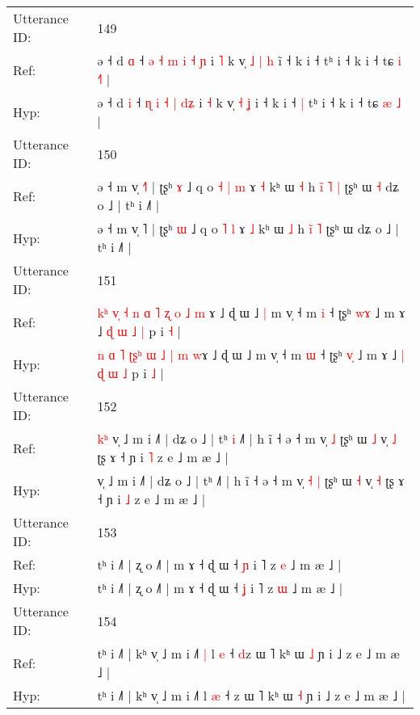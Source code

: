 \documentclass[10pt]{article}
\DeclareRobustCommand{\hl}[1]{{\textcolor{red}{#1}}}
\begin{document}
\begin{longtable}{ll}
 \\
\midrule
Utterance ID: & 149 \\
Ref: & ə ˧ d \hl{ɑ} ˧ \hl{ə} \hl{˧} \hl{m} \hl{i} \hl{˧}\hl{ }\hl{ɲ} i \hl{˥} k v̩\hl{ }\hl{˩} \hl{|} \hl{h} i\hl{̃} ˧ k i ˧\hl{}\hl{} tʰ i ˧ k i ˧ tɕ \hl{i} \hl{˧}\hl{˥} |
 \\
Hyp: & ə ˧ d \hl{i} ˧ \hl{ɳ} \hl{i} \hl{˧} \hl{|} \hl{}\hl{d}\hl{ʑ} i \hl{˧} k v̩\hl{}\hl{} \hl{˧} \hl{ʝ} i\hl{} ˧ k i ˧\hl{ }\hl{|} tʰ i ˧ k i ˧ tɕ \hl{æ} \hl{}\hl{˩} |
 \\
\midrule
Utterance ID: & 150 \\
Ref: & ə ˧ m v̩ \hl{˧}˥ | ʈʂʰ \hl{ɤ} ˩ q o\hl{ }\hl{˧} \hl{|} \hl{m} ɤ \hl{˧} kʰ ɯ \hl{˧} h \hl{ĩ}\hl{ }\hl{˥} \hl{|} ʈʂʰ ɯ\hl{ }\hl{˧} dʑ o ˩ | tʰ i ˩˥ |
 \\
Hyp: & ə ˧ m v̩ \hl{}˥ | ʈʂʰ \hl{ɯ} ˩ q o\hl{}\hl{} \hl{˥} \hl{l} ɤ \hl{˩} kʰ ɯ \hl{˩} h \hl{}\hl{i}\hl{̃} \hl{˥} ʈʂʰ ɯ\hl{}\hl{} dʑ o ˩ | tʰ i ˩˥ |
 \\
\midrule
Utterance ID: & 151 \\
Ref: & \hl{k}\hl{ʰ} \hl{v}\hl{̩} \hl{˧} \hl{n}\hl{ }\hl{ɑ} \hl{˥} \hl{ʐ} \hl{o} \hl{˩} \hl{m}\hl{ }ɤ ˩ ɖ ɯ ˩\hl{ }\hl{|} m v̩ ˧ m \hl{i} ˧ ʈʂʰ \hl{w}\hl{ɤ} ˩ m ɤ ˩ \hl{ɖ} \hl{ɯ} \hl{˩} \hl{|} p i \hl{˧} |
 \\
Hyp: & \hl{}\hl{n} \hl{}\hl{ɑ} \hl{˥} \hl{ʈ}\hl{ʂ}\hl{ʰ} \hl{ɯ} \hl{˩} \hl{|} \hl{m} \hl{}\hl{w}ɤ ˩ ɖ ɯ ˩\hl{}\hl{} m v̩ ˧ m \hl{ɯ} ˧ ʈʂʰ \hl{v}\hl{̩} ˩ m ɤ ˩ \hl{|} \hl{ɖ} \hl{ɯ} \hl{˩} p i \hl{˩} |
 \\
\midrule
Utterance ID: & 152 \\
Ref: & \hl{k}\hl{ʰ}\hl{ }v̩ ˩ m i ˩˥ | dʑ o ˩ | tʰ\hl{ }\hl{i} ˩˥ | h ĩ ˧ ə ˧ m v̩\hl{}\hl{} \hl{˩} ʈʂʰ ɯ \hl{˩} v̩ \hl{˩} ʈʂ ɤ ˧ ɲ i \hl{˥} z e ˩ m æ ˩ |
 \\
Hyp: & \hl{}\hl{}\hl{}v̩ ˩ m i ˩˥ | dʑ o ˩ | tʰ\hl{}\hl{} ˩˥ | h ĩ ˧ ə ˧ m v̩\hl{ }\hl{˧} \hl{|} ʈʂʰ ɯ \hl{˧} v̩ \hl{˧} ʈʂ ɤ ˧ ɲ i \hl{˩} z e ˩ m æ ˩ |
 \\
\midrule
Utterance ID: & 153 \\
Ref: & tʰ i ˩˥ | ʐ o ˩˥ | m ɤ ˧ ɖ ɯ ˧ \hl{ɲ} i ˥ z \hl{e} ˩ m æ ˩ |
 \\
Hyp: & tʰ i ˩˥ | ʐ o ˩˥ | m ɤ ˧ ɖ ɯ ˧ \hl{ʝ} i ˥ z \hl{ɯ} ˩ m æ ˩ |
 \\
\midrule
Utterance ID: & 154 \\
Ref: & tʰ i ˩˥ | kʰ v̩ ˩ m i ˩˥\hl{ }\hl{|} l \hl{e} ˧ \hl{d}z ɯ ˥ kʰ ɯ \hl{˩} ɲ i ˩ z e ˩ m æ ˩ |
 \\
Hyp: & tʰ i ˩˥ | kʰ v̩ ˩ m i ˩˥\hl{}\hl{} l \hl{æ} ˧ \hl{}z ɯ ˥ kʰ ɯ \hl{˧} ɲ i ˩ z e ˩ m æ ˩ |

\end{longtable}
\end{document}
